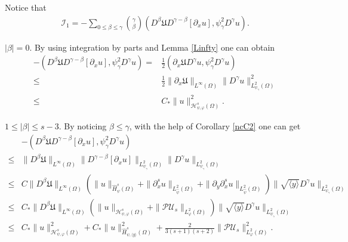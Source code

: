 \documentclass{amsart}
\numberwithin{equation}{section}
\newcommand\y{{{\langle y \rangle}}}
\begin{document}
Notice that
\begin{align*}
\mathcal{I}_{1}
=-\sum_{0\leq\beta\leq\gamma}\binom{\gamma}{\beta}(D^{\beta}\mathfrak{U}D^{\gamma-\beta}[\partial_{x}u],\psi_{\gamma}^{2} D^{\gamma}u).
\end{align*}

 $|\beta|=0$. By using integration by parts and Lemma \ref{Linfty} one can obtain
\begin{align*}
-(D^{\beta}\mathfrak{U}D^{\gamma-\beta}[\partial_{x}u],\psi_{\gamma}^{2}D^{\gamma}u)
=&\frac{1}{2}(\partial_{x}\mathfrak{U}D^{\gamma}u,\psi_{\gamma}^{2}D^{\gamma}u)\\
\leq& \frac{1}{2}\|\partial_{x}\mathfrak{U}\|_{L^{\infty}(\Omega)}\|D^{\gamma}u\|_{L_{\psi_{\gamma}}^{2}(\Omega)}^{2}\\
\leq& C_{*}\|u\|_{\mathcal{H}_{\psi,\varphi}^{s}(\Omega)}^{2}.
\end{align*}

 $1\leq|\beta|\leq s-3$. By noticing $\beta\leq\gamma$, with the help of Corollary \ref{ncC2} one can get
\begin{align*}
&-(D^{\beta}\mathfrak{U}D^{\gamma-\beta}[\partial_{x}u],\psi_{\gamma}^{2}D^{\gamma}u)\\
\leq& \|D^{\beta}\mathfrak{U}\|_{L^{\infty}(\Omega)}
      \|D^{\gamma-\beta}[\partial_{x}u]\|_{L_{\psi_{\gamma}}^{2}(\Omega)}
      \|D^{\gamma}u\|_{L_{\psi_{\gamma}}^{2}(\Omega)}\\
\leq& C\|D^{\beta}\mathfrak{U}\|_{L^{\infty}(\Omega)}
       \left(\|u\|_{\hat{H}_{\psi}^{s}(\Omega)}
             +\|\partial_{x}^{s}u\|_{L_{\hat{\psi}}^{2}(\Omega)}
             +\|\partial_{y}\partial_{x}^{s}u\|_{L_{\hat{\psi}}^{2}(\Omega)}\right)
       \|\sqrt{\y}D^{\gamma}u\|_{L_{\psi_{\gamma}}^{2}(\Omega)}\\
\leq& C_{*}\|D^{\beta}\mathfrak{U}\|_{L^{\infty}(\Omega)}
       (\|u\|_{\mathcal{H}_{\psi,\varphi}^{s}(\Omega)}+\|\mathcal{P}\mathcal{U}_{s}\|_{L_{\varphi}^{2}(\Omega)})
       \|\sqrt{\y}D^{\gamma}u\|_{L_{\psi_{\gamma}}^{2}(\Omega)}\\
\leq& C_{*}\|u\|_{\mathcal{H}_{\psi,\varphi}^{s}(\Omega)}^{2}
     +C_{*}\|u\|_{\hat{H}_{\psi,\y}^{s}(\Omega)}^{2}
     +\frac{2}{3(s+1)(s+2)}\|\mathcal{P}\mathcal{U}_{s}\|_{L_{\varphi}^{2}(\Omega)}^{2}.
\end{align*}
\end{document}
